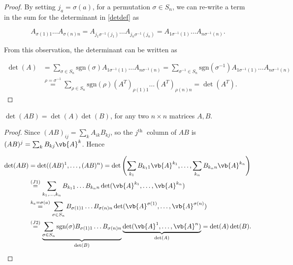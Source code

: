\documentclass[a4paper,12pt]{report}
\begin{document}
\begin{proof}
By setting $j_a = \sigma(a)$, for a permutation $\sigma \in S_n$, we can re-write a term in the sum for the determinant in \cref{detdef} as 

\begin{equation}
A_{\sigma(1)1} \ldots A_{\sigma(n)n} = A_{j_1\sigma^{-1}(j_1)} \ldots A_{j_n\sigma^{-1}(j_n)} = A_{1\sigma^{-1}(1)} \ldots A_{n\sigma^{-1}(n)}.
\end{equation}

From this observation, the determinant can be written as

\begin{equation}
\begin{aligned}
\det(A) &= \sum_{\sigma \in S_n} \text{sgn}(\sigma) A_{1\sigma^{-1}(1)} \ldots A_{n\sigma^{-1}(n)} = \sum_{\sigma^{-1} \in S_n} \text{sgn}(\sigma^{-1}) A_{1\sigma^{-1}(1)} \ldots A_{n\sigma^{-1}(n)} \\
&\overset{\rho = \sigma^{-1}}{=} \sum_{\rho \in S_n} \text{sgn}(\rho) (A^T)_{\rho(1)1} \ldots (A^T)_{\rho(n)n} = \det(A^T).
\end{aligned}
\end{equation}
\end{proof}

\begin{theorem}
\(\det (AB) = \det (A) \det (B)\), for any two \(n \times  n\) matrices \(A, B\).   
\end{theorem}

\begin{proof}
Since \((AB)_{ij} = \sum_{k}^{} A_{ik}B_{kj}   \), so the \(j^{\text{th }} \) column of \(AB\) is \((AB)^{j} = \sum_{k}^{} B_{kj}\vb{A} ^{k}\). Hence

\begin{equation}
    \begin{aligned}
    \det(AB) &= \det((AB)^1, \ldots, (AB)^n) = \det\left(\sum_{k_1} B_{k_1 1} \vb{A} ^{k_1}, \ldots, \sum_{k_n} B_{k_n n} \vb{A} ^{k_n}\right) \\
    &\overset{(J1)}{=} \sum_{k_1, \ldots, k_n} B_{k_1 1} \ldots B_{k_n n} \det(\vb{A} ^{k_1}, \ldots, \vb{A} ^{k_n}) \\
    &\overset{k_a = \sigma(a)}{=} \sum_{\sigma \in S_n} B_{\sigma(1)1} \ldots B_{\sigma(n)n} \det(\vb{A} ^{\sigma(1)}, \ldots, \vb{A} ^{\sigma(n)}) \\
    &\overset{(J2)}{=} \underbrace{\sum_{\sigma \in S_n} \operatorname{sgn}(\sigma) B_{\sigma(1)1} \ldots B_{\sigma(n)n}}_{\det (B)} \underbrace{\det(\vb{A} ^1, \ldots, \vb{A} ^n)}_{\det(A)} = \det(A) \det(B).
    \end{aligned}
\end{equation}
\end{proof}
\end{document}
